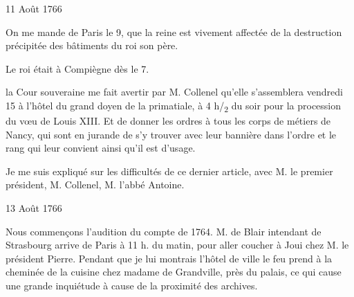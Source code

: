                      \begin{diary}{11 Août 1766}{}
                        
                         On me mande de Paris
                           le 9, que la reine
                           est vivement affectée de la destruction
                           précipitée des bâtiments du roi son père. \bigskip
        
        
                        
                           Le roi était à Compiègne dès le 7. \bigskip
        
        
                        
                           la Cour souveraine me fait avertir par M.
                              Collenel
                           qu'elle s'assemblera vendredi 15 à
                              l'hôtel du
                              grand doyen de la primatiale, à 4 h/\textsubscript{2} du soir
                           pour la procession du vœu de Louis
                              XIII. Et
                           de donner les ordres à tous les corps de métiers
                           de Nancy, qui sont en jurande de
                           s'y trouver
                           avec leur bannière dans l'ordre et le rang qui
                           leur convient ainsi qu'il est d'usage. \bigskip
        
        
                         Je me suis expliqué sur les
                           difficultés de ce
                           dernier article, avec M. le premier président,
                           M. Collenel, M. l'abbé Antoine.
                        \bigskip
        
        
                     \end{diary}

                     \begin{diary}{13 Août 1766}{}
                        
                         Nous commençons l'audition du compte
                           de
                           1764. M. de Blair intendant de Strasbourg
                           arrive de Paris à 11 h. du
                           matin, pour aller
                           coucher à Joui
                           chez
                           M. le président Pierre.
                           Pendant que je lui montrais l'hôtel de
                              ville
                           le feu prend à la cheminée de la cuisine
                           chez
                           madame de Grandville, près du palais,
                           ce qui cause une grande inquiétude à
                           cause de la proximité des archives. \bigskip
        
        
                     \end{diary}


